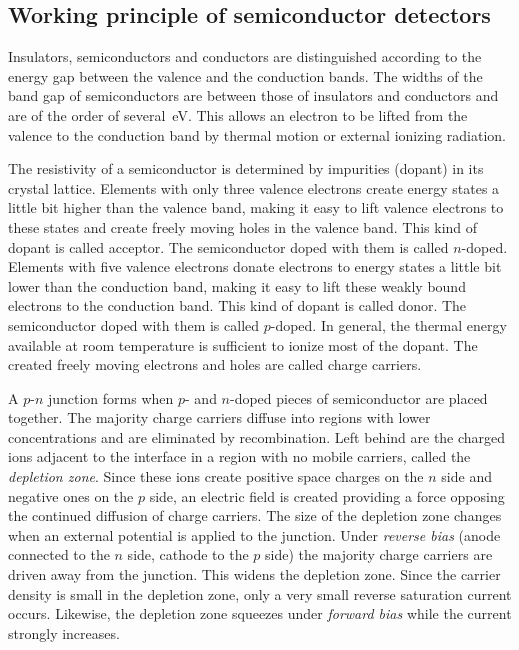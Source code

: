 \subsection{Working principle of semiconductor detectors}
\label{sec:det:prin}
Insulators, semiconductors and conductors are distinguished according to the energy gap between the valence and the conduction bands. The widths of the band gap of semiconductors are between those of insulators and conductors and are of the order of several~eV. This allows an electron to be lifted from the valence to the conduction band by thermal motion or external ionizing radiation.

The resistivity of a semiconductor is determined by impurities (dopant) in its crystal lattice. Elements with only three valence electrons create energy states a little bit higher than the valence band, making it easy to lift valence electrons to these states and create freely moving holes in the valence band. This kind of dopant is called acceptor. The semiconductor doped with them is called $n$-doped. Elements with five valence electrons donate electrons to energy states a little bit lower than the conduction band, making it easy to lift these weakly bound electrons to the conduction band. This kind of dopant is called donor. The semiconductor doped with them is called $p$-doped. In general, the thermal energy available at room temperature is sufficient to ionize most of the dopant. The created freely moving electrons and holes are called charge carriers.

A $p$-$n$ junction forms when $p$- and $n$-doped pieces of semiconductor are placed together. The majority charge carriers diffuse into regions with lower concentrations and are eliminated by recombination. Left behind are the charged ions adjacent to the interface in a region with no mobile carriers, called the \emph{depletion zone}. Since these ions create positive space charges on the $n$ side and negative ones on the $p$ side, an electric field is created providing a force opposing the continued diffusion of charge carriers. The size of the depletion zone changes when an external potential is applied to the junction. Under \emph{reverse bias} (anode connected to the $n$ side, cathode to the $p$ side) the majority charge carriers are driven away from the junction. This widens the depletion zone. Since the carrier density is small in the depletion zone, only a very small reverse saturation current occurs. Likewise, the depletion zone squeezes under \emph{forward bias} while the current strongly increases.

